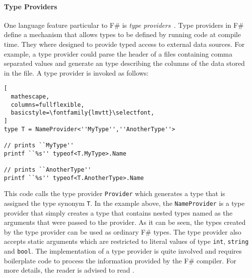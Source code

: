 \documentclass{sigplanconf}
\begin{document}
\paragraph{Type Providers}
One language feature particular to F\# is \emph{type
  providers}~\cite{typeProviders}. Type providers in F\# define a
mechanism that allows types to be defined by running code at compile
time. They where designed to provide typed access to external data
sources. For example, a type provider could parse the header of a
files containing comma separated values and generate an type
describing the columns of the data stored in the file. A type provider
is invoked as follows:
\begin{lstlisting}[
  mathescape,
  columns=fullflexible,
  basicstyle=\fontfamily{lmvtt}\selectfont,
]
type T = NameProvider<''MyType'',''AnotherType''>

// prints ``MyType''
printf ``%s'' typeof<T.MyType>.Name

// prints ``AnotherType''
printf ``%s'' typeof<T.AnotherType>.Name

\end{lstlisting}
This code calls the type provider \verb+Provider+ which generates a
type that is assigned the type synonym \verb+T+. In the example above,
the \verb+NameProvider+ is a type provider that simply creates a type
that contains nested types named as the arguments that were passed
to the provider. As it can be seen, the types created by the type
provider can be used as ordinary F\# types. The type provider also
accepts static arguments which are restricted to literal values of
type \verb+int+, \verb+string+ and \verb+bool+. The implementation of
a type provider is quite involved and requires boilerplate code
to process the information provided by the F\# compiler. For more
details, the reader is advised to read \cite{TypeProviderTutorial}.
\end{document}
